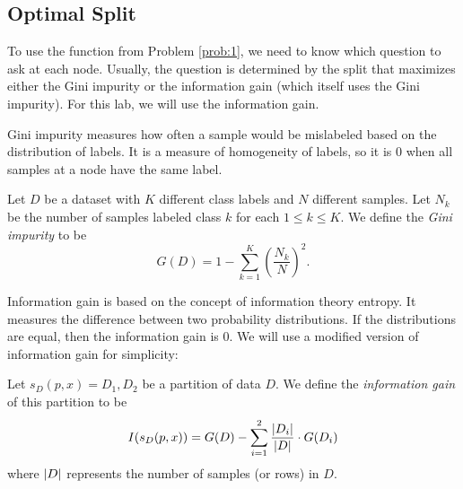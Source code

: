 \subsection*{Optimal Split}
To use the  function from Problem \ref{prob:1}, we need to know which question to ask at each node.
Usually, the question is determined by the split that maximizes either the Gini impurity or the information gain (which itself uses the Gini impurity).
For this lab, we will use the information gain.

Gini impurity measures how often a sample would be mislabeled based on the distribution of labels.
It is a measure of homogeneity of labels, so it is $0$ when all samples at a node have the same label.

\begin{definition}
Let $D$ be a dataset with $K$ different class labels and $N$ different samples.
Let $N_{k}$ be the number of samples labeled class $k$ for each $1 \leq k \leq K$.
We define the \emph{Gini impurity} to be
\begin{equation*}
G(D) = 1 - \sum_{k=1}^{K} \left(\frac{N_k}{N}\right)^2.
\end{equation*}
\end{definition}

Information gain is based on the concept of information theory entropy.
It measures the difference between two probability distributions.
If the distributions are equal, then the information gain is $0$.
We will use a modified version of information gain for simplicity:

\begin{definition}
Let $s_{D}(p,x) = D_{1},D_{2}$ be a partition of data $D$.
We define the \emph{information gain} of this partition to be
\begin{equation*}
I(s_{D}(p,x)) = G(D) - \sum_{i=1}^{2} \frac{\left\lvert D_{i}\right\rvert}{\left\lvert D\right\rvert} \cdot G(D_{i})
\end{equation*}
where $\left\lvert D\right\rvert$ represents the number of samples (or rows) in $D$.
\end{definition}

